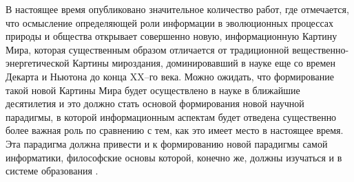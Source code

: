 В настоящее время опубликовано значительное количество работ, где отмечается, что осмысление определяющей роли информации в эволюционных процессах природы и общества открывает совершенно новую, информационную Картину Мира, которая существенным образом отличается от традиционной вещественно-энергетической Картины мироздания, доминировавший в науке еще со времен Декарта и Ньютона до конца XX–го века. Можно ожидать, что формирование такой новой Картины Мира будет осуществлено в науке в ближайшие  десятилетия и это должно стать основой формирования новой научной парадигмы, в которой информационным аспектам будет отведена существенно более важная роль по сравнению с тем, как это имеет место в настоящее время. Эта парадигма должна привести и к формированию новой парадигмы самой информатики, философские основы которой, конечно же, должны изучаться и в системе образования \cite{bib304}.









\clearpage